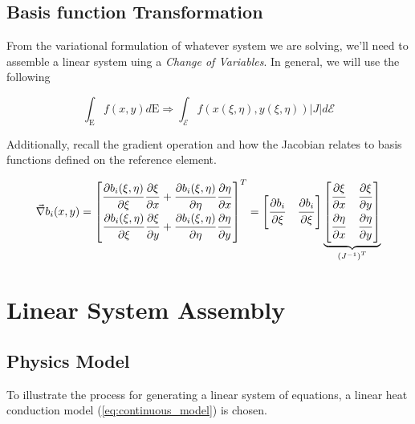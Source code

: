 \documentclass[11pt]{style/memo}
\begin{document}
\subsection{Basis function Transformation}
From the variational formulation of whatever system we are solving, we'll need
to assemble a linear system uing a \emph{Change of Variables}. In general, we
will use the following

\begin{equation*}
    \int_\mathrm{E} f(x,y) d\mathrm{E} \Rightarrow \int_\mathcal{E}
    f\left(x(\xi,\eta), y(\xi,\eta)\right)
    \left\lvert J \right\rvert
    d\mathcal{E}
\end{equation*}

Additionally, recall the gradient operation and how the Jacobian relates to
basis functions defined on the reference element.

\begin{equation*}
    \vec{\nabla} b_i(x,y) = \begin{bmatrix}
        \dfrac{\strut\partial b_i(\xi,\eta)}{\strut\partial \xi}\dfrac{\strut\partial \xi}{\strut\partial x} +
        \dfrac{\strut\partial b_i(\xi,\eta)}{\strut\partial \eta}\dfrac{\strut\partial \eta}{\strut\partial x}
        \\
        \dfrac{\strut\partial b_i(\xi,\eta)}{\strut\partial \xi}\dfrac{\strut\partial \xi}{\strut\partial y} +
        \dfrac{\strut\partial b_i(\xi,\eta)}{\strut\partial \eta}\dfrac{\strut\partial \eta}{\strut\partial y}
    \end{bmatrix}^T
    =
    \begin{bmatrix}
        \dfrac{\strut\partial b_i}{\strut\partial \xi} & \dfrac{\strut\partial b_i}{\strut\partial \xi}
    \end{bmatrix}
    \underbrace{
    \begin{bmatrix}
        \dfrac{\strut\partial \xi}{\strut\partial x} & \dfrac{\strut\partial \xi}{\strut\partial y} \\
        \dfrac{\strut\partial \eta}{\strut\partial x} & \dfrac{\strut\partial \eta}{\strut\partial y}
    \end{bmatrix}
    }_{\left(J^{-1}\right)^T}
\end{equation*}

\section{Linear System Assembly}
\subsection{Physics Model}
To illustrate the process for generating a linear system of equations, a linear heat conduction
model (\ref{eq:continuous_model}) is chosen.
\end{document}
